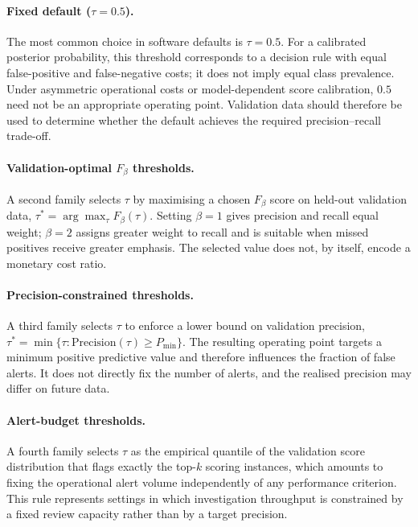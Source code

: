 \paragraph{Fixed default ($\tau{=}0.5$).}
The most common choice in software defaults is $\tau{=}0.5$. For a calibrated
posterior probability, this threshold corresponds to a decision rule with
equal false-positive and false-negative costs; it does not imply equal class
prevalence. Under asymmetric operational costs or model-dependent score
calibration, $0.5$ need not be an appropriate operating point. Validation data
should therefore be used to determine whether the default achieves the
required precision--recall trade-off.

\paragraph{Validation-optimal $F_{\beta}$ thresholds.}
A second family selects $\tau$ by maximising a chosen $F_{\beta}$ score on
held-out validation data, $\tau^{*} = \arg\max_{\tau} F_{\beta}(\tau)$.
Setting $\beta{=}1$ gives precision and recall equal weight; $\beta{=}2$
assigns greater weight to recall and is suitable when missed positives receive
greater emphasis. The selected value does not, by itself, encode a monetary
cost ratio.

\paragraph{Precision-constrained thresholds.}
A third family selects $\tau$ to enforce a lower bound on validation precision,
$\tau^{*} = \min\{\tau : \mathrm{Precision}(\tau) \geq P_{\min}\}$. The
resulting operating point targets a minimum positive predictive value and
therefore influences the fraction of false alerts. It does not directly fix the
number of alerts, and the realised precision may differ on future data.

\paragraph{Alert-budget thresholds.}
A fourth family selects $\tau$ as the empirical quantile of the validation
score distribution that flags exactly the top-$k$ scoring instances, which
amounts to fixing the operational alert volume independently of any
performance criterion. This rule represents settings in which investigation
throughput is constrained by a fixed review capacity rather than by a target
precision.

